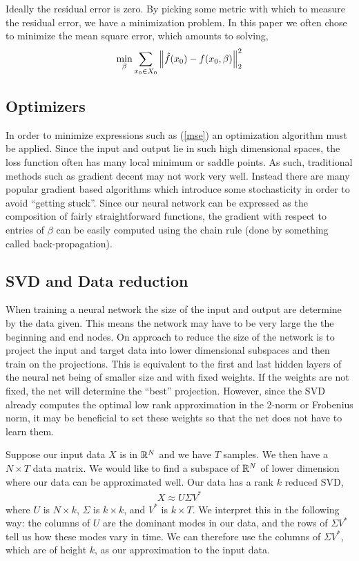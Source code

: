 \documentclass[10pt]{article}
\begin{document}
Ideally the residual error is zero. By picking some metric with which to measure the residual error, we have a minimization problem. In this paper we often chose to minimize the mean square error, which amounts to solving,
\begin{align}
    \min_{\beta} \sum_{x_0\in X_0} \left\lVert\hat{f}(x_0)-f(x_0,\beta)\right\rVert_2^2 \label{mse}
\end{align}

\subsection{Optimizers}
In order to minimize expressions such as (\ref{mse}) an optimization algorithm must be applied. Since the input and output lie in such high dimensional spaces, the loss function often has many local minimum or saddle points. As such, traditional methods such as gradient decent may not work very well. Instead there are many popular gradient based algorithms which introduce some stochasticity in order to avoid ``getting stuck''. Since our neural network can be expressed as the composition of fairly straightforward functions, the gradient with respect to entries of \( \beta \) can be easily computed using the chain rule (done by something called back-propagation).

\subsection{SVD and Data reduction}
When training a neural network the size of the input and output are determine by the data given. This means the network may have to be very large the the beginning and end nodes. On approach to reduce the size of the network is to project the input and target data into lower dimensional subspaces and then train on the projections. This is equivalent to the first and last hidden layers of the neural net being of smaller size and with fixed weights. If the weights are not fixed, the net will determine the ``best'' projection. However, since the SVD already computes the optimal low rank approximation in the 2-norm or Frobenius norm, it may be beneficial to set these weights so that the net does not have to learn them.

Suppose our input data \( X \) is in \( \mathbb{R}^{N} \) and we have \( T \) samples. We then have a \( N\times T \) data matrix. We would like to find a subspace of \( \mathbb{R}^{N} \) of lower dimension where our data can be approximated well. Our data has a rank \( k \) reduced SVD,
\begin{align}
    X \approx U\Sigma V^* \label{SVD_eq}
\end{align}
where \( U  \) is \( N\times k \), \( \Sigma \) is \( k\times k \), and \( V^* \) is \( k\times T \). We interpret this in the following way: the columns of \( U \) are the dominant modes in our data, and the rows of \( \Sigma V^* \) tell us how these modes vary in time. We can therefore use the columns of \( \Sigma V^* \), which are of height \( k \), as our approximation to the input data.
\end{document}
